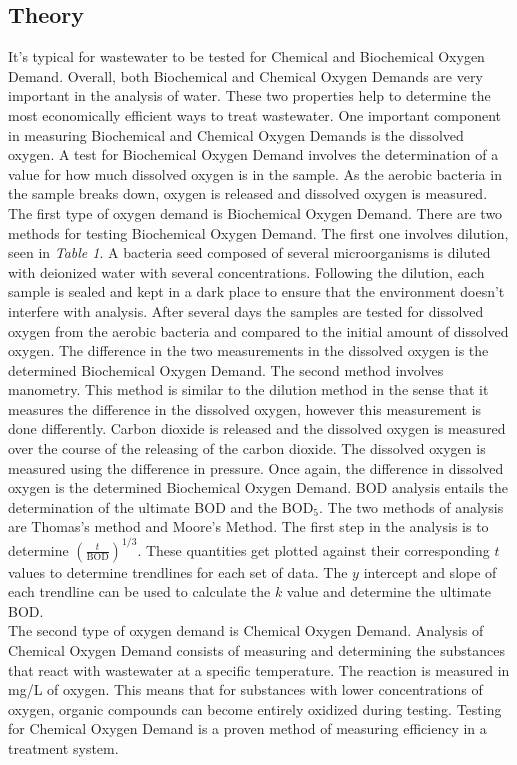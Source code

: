 \documentclass{article}
\begin{document}
    \subsection{Theory}
    \indent It's typical for wastewater to be tested for Chemical and Biochemical Oxygen Demand. Overall, both Biochemical and Chemical Oxygen Demands are very important in the analysis of water. These two properties help to determine the most economically efficient ways to treat wastewater. One important component in measuring Biochemical and Chemical Oxygen Demands is the dissolved oxygen. A test for Biochemical Oxygen Demand involves the determination of a value for how much dissolved oxygen is in the sample. As the aerobic bacteria in the sample breaks down, oxygen is released and dissolved oxygen is measured. \\
    \indent The first type of oxygen demand is Biochemical Oxygen Demand. There are two methods for testing Biochemical Oxygen Demand. The first one involves dilution, seen in \emph{Table 1}. A bacteria seed composed of several microorganisms is diluted with deionized water with several concentrations. Following the dilution, each sample is sealed and kept in a dark place to ensure that the environment doesn't interfere with analysis. After several days the samples are tested for dissolved oxygen from the aerobic bacteria and compared to the initial amount of dissolved oxygen. The difference in the two measurements in the dissolved oxygen is the determined Biochemical Oxygen Demand. The second method involves manometry. This method is similar to the dilution method in the sense that it measures the difference in the dissolved oxygen, however this measurement is done differently. Carbon dioxide is released and the dissolved oxygen is measured over the course of the releasing of the carbon dioxide. The dissolved oxygen is measured using the difference in pressure. Once again, the difference in dissolved oxygen is the determined Biochemical Oxygen Demand. BOD analysis entails the determination of the ultimate BOD and the \(\text{BOD}_5\). The two methods of analysis are Thomas's method and Moore's Method. The first step in the analysis is to determine \(\left(\frac{t}{\text{BOD}}\right)^{1/3}\). These quantities get plotted against their corresponding \(t\) values to determine trendlines for each set of data. The \(y\) intercept and slope of each trendline can be used to calculate the \(k\) value and determine the ultimate BOD.\\
    \indent The second type of oxygen demand is Chemical Oxygen Demand. Analysis of Chemical Oxygen Demand consists of measuring and determining the substances that react with wastewater at a specific temperature. The reaction is measured in mg/L of oxygen. This means that for substances with lower concentrations of oxygen, organic compounds can become entirely oxidized during testing. Testing for Chemical Oxygen Demand is a proven method of measuring efficiency in a treatment system.
\end{document}
